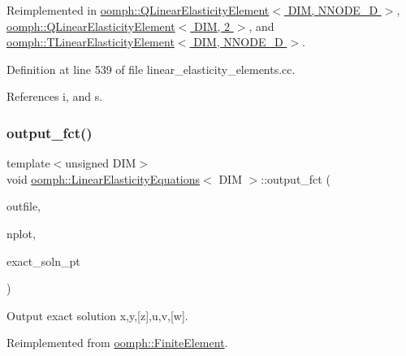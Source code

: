 Reimplemented in \hyperlink{classoomph_1_1QLinearElasticityElement_a0463c6394c7ef11cef70e036e8845743}{oomph\+::\+Q\+Linear\+Elasticity\+Element$<$ D\+I\+M, N\+N\+O\+D\+E\+\_\+D $>$}, \hyperlink{classoomph_1_1QLinearElasticityElement_a0463c6394c7ef11cef70e036e8845743}{oomph\+::\+Q\+Linear\+Elasticity\+Element$<$ D\+I\+M, 2 $>$}, and \hyperlink{classoomph_1_1TLinearElasticityElement_ab819534efce64389b6e06bc90acefc86}{oomph\+::\+T\+Linear\+Elasticity\+Element$<$ D\+I\+M, N\+N\+O\+D\+E\+\_\+D $>$}.



Definition at line 539 of file linear\+\_\+elasticity\+\_\+elements.\+cc.



References i, and s.

\mbox{\label{classoomph_1_1LinearElasticityEquations_a039f66979684d41503f45cdbf87cfc3b}} 
\subsubsection{\texorpdfstring{output\+\_\+fct()}{output\_fct()}\hspace{0.1cm}{\footnotesize\ttfamily [1/2]}}
{\footnotesize\ttfamily template$<$unsigned D\+IM$>$ \\
void \hyperlink{classoomph_1_1LinearElasticityEquations}{oomph\+::\+Linear\+Elasticity\+Equations}$<$ D\+IM $>$\+::output\+\_\+fct (\begin{DoxyParamCaption}\item[{std\+::ostream \&}]{outfile,  }\item[{const unsigned \&}]{nplot,  }\item[{\hyperlink{classoomph_1_1FiniteElement_a690fd33af26cc3e84f39bba6d5a85202}{Finite\+Element\+::\+Steady\+Exact\+Solution\+Fct\+Pt}}]{exact\+\_\+soln\+\_\+pt }\end{DoxyParamCaption})\hspace{0.3cm}{\ttfamily [virtual]}}



Output exact solution x,y,\mbox{[}z\mbox{]},u,v,\mbox{[}w\mbox{]}. 



Reimplemented from \hyperlink{classoomph_1_1FiniteElement_a22b695c714f60ee6cd145be348042035}{oomph\+::\+Finite\+Element}.



